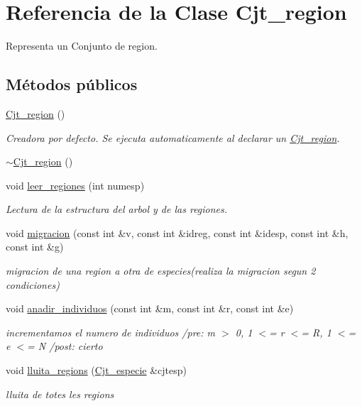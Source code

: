 \hypertarget{class_cjt__region}{
\section{\-Referencia de la \-Clase \-Cjt\-\_\-region}
\label{class_cjt__region}
}


\-Representa un \-Conjunto de region.  


\subsection*{\-Métodos públicos}
\begin{DoxyCompactItemize}
\item 
\hyperlink{class_cjt__region_acd267eb832fc34c1a8b068c202befef0}{\-Cjt\-\_\-region} ()
\begin{DoxyCompactList}\small\item\em \-Creadora por defecto. \-Se ejecuta automaticamente al declarar un \hyperlink{class_cjt__region}{\-Cjt\-\_\-region}. \end{DoxyCompactList}\item 
\hyperlink{class_cjt__region_aaa16d196a8249fc74f237454dbf67145}{$\sim$\-Cjt\-\_\-region} ()
\item 
void \hyperlink{class_cjt__region_a5dedc9d3b3b3aa4580a3c8d2feefe784}{leer\-\_\-regiones} (int numesp)
\begin{DoxyCompactList}\small\item\em \-Lectura de la estructura del arbol y de las regiones. \end{DoxyCompactList}\item 
void \hyperlink{class_cjt__region_aeb226b4972f14bd3897ef5c4bce2fd38}{migracion} (const int \&v, const int \&idreg, const int \&idesp, const int \&h, const int \&g)
\begin{DoxyCompactList}\small\item\em migracion de una region a otra de especies(realiza la migracion segun 2 condiciones) \end{DoxyCompactList}\item 
void \hyperlink{class_cjt__region_a1e90f5029b4ccb2819a0e24593a856a9}{anadir\-\_\-individuos} (const int \&m, const int \&r, const int \&e)
\begin{DoxyCompactList}\small\item\em incrementamos el numero de individuos /pre\-: m $>$ 0, 1 $<$= r $<$= \-R, 1 $<$= e $<$= \-N /post\-: cierto \end{DoxyCompactList}\item 
void \hyperlink{class_cjt__region_ab04b397ef827894b19d25e19325d2980}{lluita\-\_\-regions} (\hyperlink{class_cjt__especie}{\-Cjt\-\_\-especie} \&cjtesp)
\begin{DoxyCompactList}\small\item\em lluita de totes les regions \end{DoxyCompactList}\end{DoxyCompactItemize}


